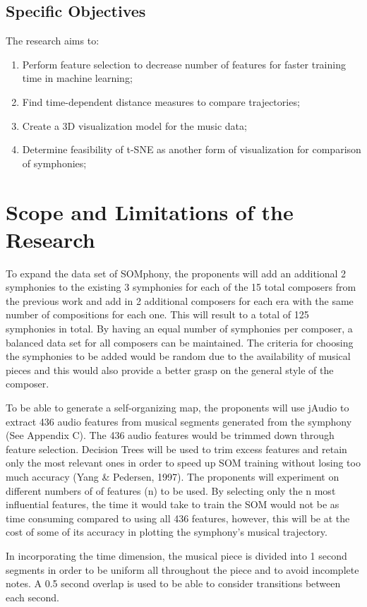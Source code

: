 \subsection{Specific Objectives}
\label{sec:specificobjectives}
The research aims to:
\begin{enumerate}
\item Perform feature selection to decrease number of features for faster training time in machine learning;
\item Find time-dependent distance measures to compare trajectories;
\item Create a 3D visualization model for the music data;
\item Determine feasibility of t-SNE as another form of visualization for comparison of symphonies;
\end{enumerate}
\section{Scope and Limitations of the Research}
\label{sec:scopelimitations}
To expand the data set of SOMphony, the proponents will add an additional 2 symphonies to the existing 3 symphonies for each of the 15 total composers from the previous work and add in 2 additional composers for each era with the same number of compositions for each one. This will result to a total of 125 symphonies in total. By having an equal number of symphonies per composer, a balanced data set for all composers can be maintained. The criteria for choosing the symphonies to be added would be random due to the availability of musical pieces and  this would also provide a better grasp on the general style of the composer.

To be able to generate a self-organizing map, the proponents will use jAudio to extract 436 audio features from musical segments generated from the symphony (See Appendix C). The 436 audio features would be trimmed down through feature selection. Decision Trees will be used to trim excess features and retain only the most relevant ones in order to speed up SOM training without losing too much accuracy (Yang \& Pedersen, 1997). The proponents will experiment on different numbers of of features (n) to be used. By selecting only the n most influential features, the time it would take to train the SOM would not be as time consuming compared to using all 436 features, however, this will be at the cost of some of its accuracy in plotting the symphony's musical trajectory.

In incorporating the time dimension, the musical piece is divided into 1 second segments in order to be uniform all throughout the piece and to avoid incomplete notes. A 0.5 second overlap is used to be able to consider transitions between each second. 

